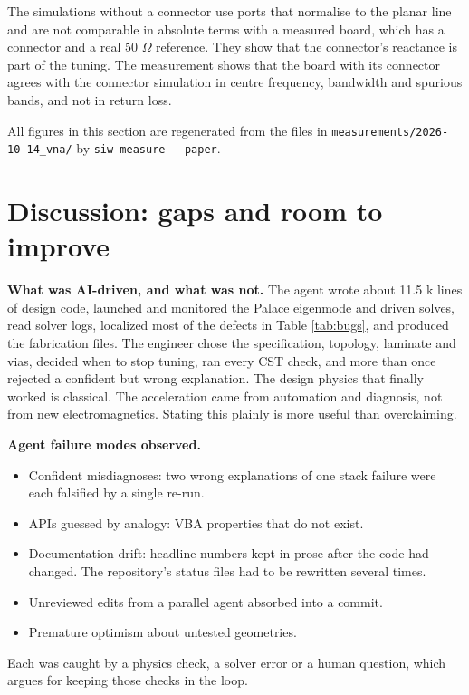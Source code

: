 \documentclass{ieeeaccess}
\begin{document}
The simulations without a connector use ports that normalise to the planar
line and are not comparable in absolute terms with a measured board, which has
a connector and a real 50 \ensuremath{\Omega} reference. They show that the connector's
reactance is part of the tuning. The measurement shows that the board with its
connector agrees with the connector simulation in centre frequency,
bandwidth and spurious bands, and not in return loss.

All figures in this section are regenerated from the files in
\texttt{measurements/2026-10-14\_vna/} by \texttt{siw\ measure\ -\/-paper}.

\hypertarget{discussion-gaps-and-room-to-improve}{%
\section{Discussion: gaps and room to improve}\label{discussion-gaps-and-room-to-improve}}

\textbf{What was AI-driven, and what was not.} The agent wrote about 11.5 k lines
of design code, launched and monitored the Palace eigenmode and driven solves, read solver logs, localized
most of the defects in Table \ref{tab:bugs}, and produced the fabrication
files. The engineer chose the specification, topology, laminate and vias,
decided when to stop tuning, ran every CST check, and more than once rejected
a confident but wrong explanation. The design physics that finally worked is
classical. The acceleration came from automation and diagnosis, not from new
electromagnetics. Stating this plainly is more useful than overclaiming.

\textbf{Agent failure modes observed.}

\begin{itemize}
\item
  Confident misdiagnoses: two wrong explanations of one stack failure were
  each falsified by a single re-run.
\item
  APIs guessed by analogy: VBA properties that do not exist.
\item
  Documentation drift: headline numbers kept in prose after the code had
  changed. The repository's status files had to be rewritten several times.
\item
  Unreviewed edits from a parallel agent absorbed into a commit.
\item
  Premature optimism about untested geometries.
\end{itemize}

Each was caught by a physics check, a solver error or a human question, which
argues for keeping those checks in the loop.
\end{document}
